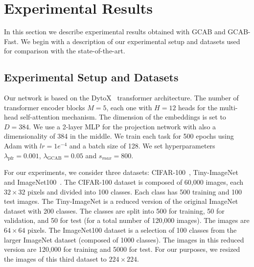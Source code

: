 \documentclass[twocolumn]{svjour3}          %
\begin{document}
\section{Experimental Results}

In this section we describe experimental results obtained with GCAB and GCAB-Fast. We begin with a description of our experimental setup and datasets used for comparison with the state-of-the-art.

\subsection{Experimental Setup and Datasets}
\label{sec:datasets}

Our network is based on the DytoX~\citep{douillard2022dytox} transformer architecture. The number of transformer encoder blocks $M=5$, each one with $H=12$ heads for the multi-head self-attention mechanism. The dimension of the embeddings is set to $D=384$. We use a 2-layer MLP for the projection network with also a dimensionality of 384 in the middle. We train each task for 500 epochs using Adam with $lr=1e^{-4}$ and a batch size of 128. We set hyperparameters $\lambda_{\text{pfr}}=0.001$, $\lambda_{\text{GCAB}}=0.05$ and $s_{max}=800$. 

For our experiments, we consider three datasets: CIFAR-100~\citep{krizhevsky2009learning}, Tiny-ImageNet~\citep{le2015tiny} and ImageNet100~\citep{russakovsky2015imagenet}. The CIFAR-100 dataset is composed of 60,000 images, each $32 \times 32$ pixels and divided into 100 classes. Each class has 500 training and 100 test images. The Tiny-ImageNet is a reduced version of the original ImageNet dataset with 200 classes. The classes are split into 500 for training, 50 for validation, and 50 for test (for a total number of 120,000 images). The images are $64 \times 64$ pixels.
The ImageNet100 dataset is a selection of 100 classes from the larger ImageNet dataset (composed of 1000 classes). The images in this reduced version are 120,000 for training and 5000 for test. For our purposes, we resized the images of this third dataset to $224 \times 224$.
\end{document}
